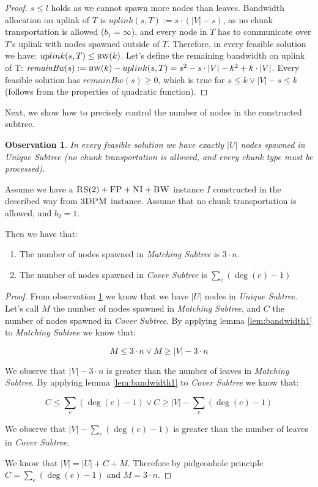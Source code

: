\documentclass[preprint,12pt]{elsarticle}
\newcommand{\CC}{\textsc{NI}}
\newcommand{\FP}{\textsc{FP}}
\newcommand{\RS}{\textsc{RS}}
\newcommand{\BW}{\textsc{BW}}
\newcommand{\TDPM}{\textsc{3DPM}}
\newcommand{\numNodes}{\ensuremath{|V|}}
\newcommand{\UnqSubtree}{{{\emph{Unique Subtree}}}}
\newcommand{\MatchSubtree}{{\emph{Matching Subtree}}}
\newcommand{\CoverSubtree}{{\emph{Cover Subtree}}}
\newcommand{\remainBw}{\textit{remainBw}}
\newcommand{\Band}{\textsc{bw}}
\newtheorem{obs}{Observation}
\newcommand{\CostTrans}{\ensuremath{b_1}}
\newcommand{\CostCom}{\ensuremath{b_2}}
\begin{document}
\begin{proof}
  $s\leq l$ holds as we cannot spawn more nodes than leaves.
  Bandwidth allocation on uplink of $T$ is
  $uplink(s,T) := s\cdot (\numNodes - s)$, as no chunk transportation
  is allowed ($\CostTrans = \infty$), and every node in $T$ has to
  communicate over $T$'s uplink with nodes spawned outside of
  $T$. Therefore, in every feasible solution we have:
  $uplink(s, T) \leq \Band(k)$.  Let's define the remaining bandwidth
  on uplink of T:
  $\remainBw(s) := \Band(k)-uplink(s, T) = s^2 - s\cdot \numNodes -
  k^2+k\cdot \numNodes $.
  Every feasible solution has $\remainBw(s) \geq 0$, which is true for
  $s \leq k \vee \numNodes-s\leq k$ (follows from the properties of
  quadratic function).
\end{proof}


Next, we show how to precisely control the number of nodes in the constructed subtree.

\begin{obs}
  In every feasible solution we have exactly $|U|$ nodes spawned in {\UnqSubtree} (no chunk transportation is allowed, and every chunk type must be processed).
    \label{obs:unq-full}
\end{obs}


\begin{lemma}
  Assume we have a $\RS(2)+\FP+\CC+\BW$ instance $I$ constructed in the described way from $\TDPM$ instance.  Assume that no
  chunk transportation is allowed, and $\CostCom = 1$.

  Then we have that:
  \begin{enumerate}
    \item The number of nodes spawned in {\MatchSubtree} is $3\cdot n$.
    \item The number of nodes spawned in {\CoverSubtree} is $\sum_e(\deg(e)-1)$
  \end{enumerate}

  \label{lem:bandwidth2}
\end{lemma}

\begin{proof}
 From observation \ref{obs:unq-full} we know that we have $|U|$ nodes in {\UnqSubtree}. Let's call $M$ the number of nodes spawned in {\MatchSubtree}, and $C$ the number of nodes spawned in {\CoverSubtree}. By applying lemma \ref{lem:bandwidth1} to {\MatchSubtree} we know that:

  $$ M \leq 3\cdot n \vee M \geq |V| - 3\cdot n$$

  We observe that $|V| - 3\cdot n$ is greater than the number of leaves in {\MatchSubtree}.
 By applying lemma \ref{lem:bandwidth1} to {\CoverSubtree} we know that:

  $$ C \leq \sum_e(\deg(e)-1) \vee C \geq |V| - \sum_e(\deg(e)-1) $$

  We observe that $|V| - \sum_e(\deg(e)-1)$ is greater than the number of leaves in {\CoverSubtree}.

  We know that $|V| = |U| + C + M$. Therefore by pidgeonhole principle $C = \sum_e(\deg(e)-1)$ and $M = 3\cdot n$.
\end{proof}
\end{document}
